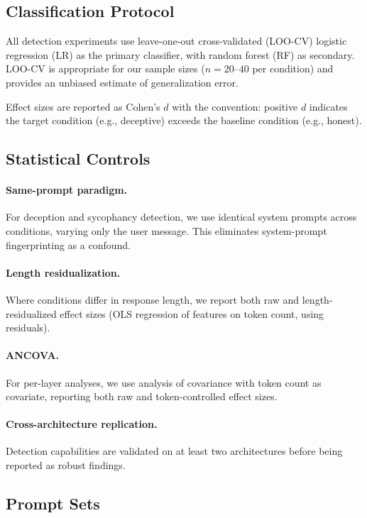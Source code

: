 \subsection{Classification Protocol}

All detection experiments use leave-one-out cross-validated (LOO-CV) logistic regression (LR) as the primary classifier, with random forest (RF) as secondary. LOO-CV is appropriate for our sample sizes ($n = 20$--$40$ per condition) and provides an unbiased estimate of generalization error.

Effect sizes are reported as Cohen's $d$ with the convention: positive $d$ indicates the target condition (e.g., deceptive) exceeds the baseline condition (e.g., honest).

\subsection{Statistical Controls}

\paragraph{Same-prompt paradigm.} For deception and sycophancy detection, we use identical system prompts across conditions, varying only the user message. This eliminates system-prompt fingerprinting as a confound.

\paragraph{Length residualization.} Where conditions differ in response length, we report both raw and length-residualized effect sizes (OLS regression of features on token count, using residuals).

\paragraph{ANCOVA.} For per-layer analyses, we use analysis of covariance with token count as covariate, reporting both raw and token-controlled effect sizes.

\paragraph{Cross-architecture replication.} Detection capabilities are validated on at least two architectures before being reported as robust findings.

\subsection{Prompt Sets}

